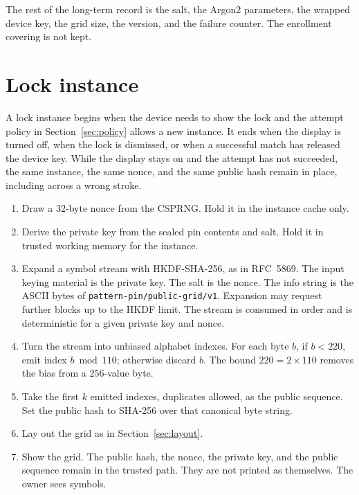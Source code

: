 \documentclass[11pt]{article}
\begin{document}
The rest of the long-term record is the salt, the Argon2 parameters, the wrapped device key, the grid size, the version, and the failure counter.
The enrollment covering is not kept.

\section{Lock instance}
\label{sec:instance}

A lock instance begins when the device needs to show the lock and the attempt policy in Section~\ref{sec:policy} allows a new instance.
It ends when the display is turned off, when the lock is dismissed, or when a successful match has released the device key.
While the display stays on and the attempt has not succeeded, the same instance, the same nonce, and the same public hash remain in place, including across a wrong stroke.

\begin{enumerate}
  \item Draw a \(32\)-byte nonce from the CSPRNG.
        Hold it in the instance cache only.
  \item Derive the private key from the sealed pin contents and salt.
        Hold it in trusted working memory for the instance.
  \item Expand a symbol stream with HKDF-SHA-256, as in RFC~5869.
        The input keying material is the private key.
        The salt is the nonce.
        The info string is the ASCII bytes of \texttt{pattern-pin/public-grid/v1}.
        Expansion may request further blocks up to the HKDF limit.
        The stream is consumed in order and is deterministic for a given private key and nonce.
  \item Turn the stream into unbiased alphabet indexes.
        For each byte \(b\), if \(b < 220\), emit index \(b \bmod 110\); otherwise discard \(b\).
        The bound \(220 = 2 \times 110\) removes the bias from a \(256\)-value byte.
  \item Take the first \(k\) emitted indexes, duplicates allowed, as the public sequence.
        Set the public hash to SHA-256 over that canonical byte string.
  \item Lay out the grid as in Section~\ref{sec:layout}.
  \item Show the grid.
        The public hash, the nonce, the private key, and the public sequence remain in the trusted path.
        They are not printed as themselves.
        The owner sees symbols.
\end{enumerate}
\end{document}
